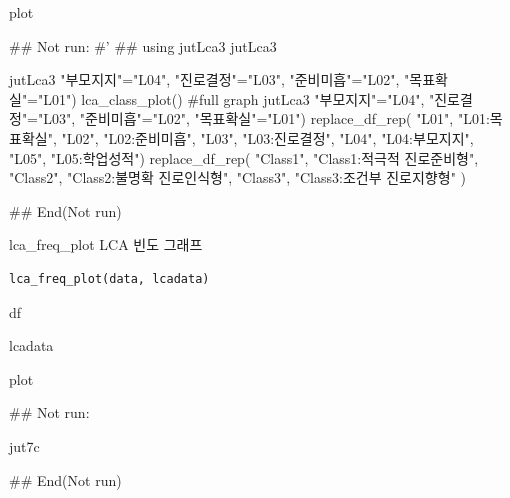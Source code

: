 \documentclass[a4paper]{book}
\begin{document}
%
\begin{Value}
plot
\end{Value}
%
\begin{Examples}
\begin{ExampleCode}
## Not run: 
#'
## using
jutLca3 %
jutLca3 %

jutLca3 %
                         "부모지지"="L04",
                         "진로결정"="L03",
                         "준비미흡"="L02",
                         "목표확실"="L01") %
  lca_class_plot()
#full graph
jutLca3 %
                         "부모지지"="L04",
                         "진로결정"="L03",
                         "준비미흡"="L02",
                         "목표확실"="L01") %
  replace_df_rep(
    "L01", "L01:목표확실",
    "L02", "L02:준비미흡",
    "L03", "L03:진로결정",
    "L04", "L04:부모지지",
    "L05", "L05:학업성적")%
  replace_df_rep(
    "Class1", "Class1:적극적 진로준비형",
    "Class2", "Class2:불명확 진로인식형",
    "Class3", "Class3:조건부 진로지향형"
  )%


## End(Not run)
\end{ExampleCode}
\end{Examples}
%
\begin{Description}
lca\_freq\_plot LCA 빈도 그래프
\end{Description}
%
\begin{Usage}
\begin{verbatim}
lca_freq_plot(data, lcadata)
\end{verbatim}
\end{Usage}
%
\begin{Arguments}
\begin{ldescription}
\item[\code{data}] df

\item[\code{lcadata}] lcadata
\end{ldescription}
\end{Arguments}
%
\begin{Value}
plot
\end{Value}
%
\begin{Examples}
\begin{ExampleCode}
## Not run: 

jut7c %

## End(Not run)
\end{ExampleCode}
\end{Examples}
\end{document}
